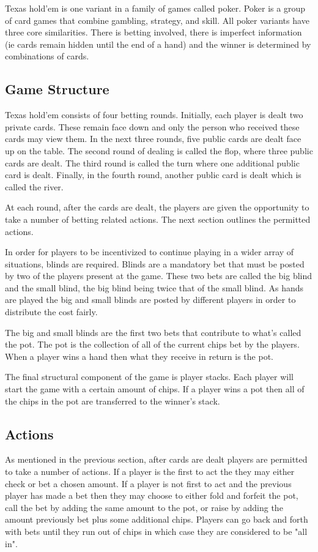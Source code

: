 Texas hold'em is one variant in a family of games called poker.
Poker is a group of card games that combine gambling, strategy, and skill.
All poker variants have three core similarities.
There is betting involved, there is imperfect information (ie cards remain hidden until the end of a hand)
and the winner is determined by combinations of cards.

\subsection{Game Structure}\label{subsec:bettingRounds}
Texas hold'em consists of four betting rounds.
Initially, each player is dealt two private cards.
These remain face down and only the person who received these cards may view them.
In the next three rounds, five public cards are dealt face up on the table.
The second round of dealing is called the flop, where three public cards are dealt.
The third round is called the turn where one additional public card is dealt.
Finally, in the fourth round, another public card is dealt which is called the river.

At each round, after the cards are dealt, the players are given the opportunity to take a number of betting
related actions.
The next section outlines the permitted actions.

In order for players to be incentivized to continue playing in a wider array of situations, blinds are required.
Blinds are a mandatory bet that must be posted by two of the players present at the game.
These two bets are called the big blind and the small blind, the big blind being twice that of the small blind.
As hands are played the big and small blinds are posted by different players in order to distribute the cost fairly.

The big and small blinds are the first two bets that contribute to what's called the pot.
The pot is the collection of all of the current chips bet by the players.
When a player wins a hand then what they receive in return is the pot.

The final structural component of the game is player stacks.
Each player will start the game with a certain amount of chips.
If a player wins a pot then all of the chips in the pot are transferred to the winner's stack.

\subsection{Actions}\label{subsec:actions}
As mentioned in the previous section, after cards are dealt players are permitted to take a number of actions.
If a player is the first to act the they may either check or bet a chosen amount.
If a player is not first to act and the previous player has made a bet then they may choose
to either fold and forfeit the pot, call the bet by adding the same amount to the pot, or raise by
adding the amount previously bet plus some additional chips.
Players can go back and forth with bets until they run out of chips in which case they are
considered to be "all in".

